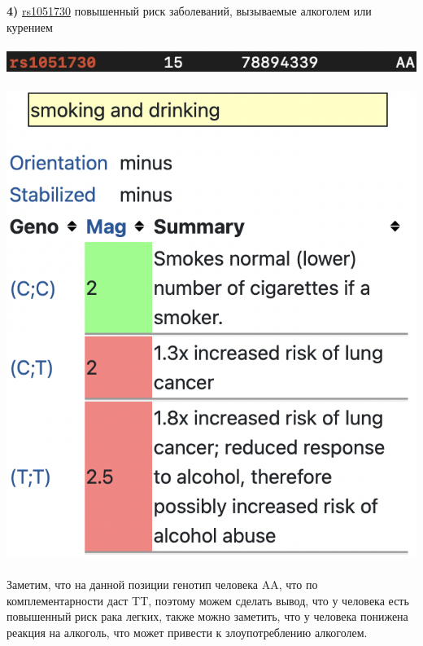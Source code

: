 \documentclass[12pt]{article}
\begin{document}
\textbf{4)} \href{https://www.snpedia.com/index.php/Rs1051730}{rs1051730} повышенный риск заболеваний, вызываемые алкоголем или курением\\\\
\includegraphics[width=\textwidth]{images/image7.png}\\\\
\includegraphics[scale=1.03]{images/rs1051730.png}\\\\
Заметим, что на данной позиции генотип человека AA, что по комплементарности даст TT, поэтому можем сделать вывод, что у человека есть повышенный риск рака легких, также можно заметить, что у человека понижена реакция на алкоголь, что может привести к злоупотреблению алкоголем.
\end{document}
